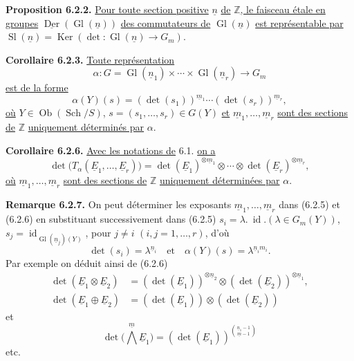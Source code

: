 \documentclass{article}
\newcommand{\Gl}{\operatorname{Gl}}
\newcommand{\Der}{\operatorname{Der}}
\newcommand{\Sch}{\operatorname{Sch}}
\newcommand{\Ker}{\operatorname{Ker}}
\begin{document}
\clearpage
\textbf{Proposition 6.2.2.} \uline{Pour toute section positive} \(\underline{n}\) \uline{de} \(\mathbb Z\)\uline{, le faisceau étale en groupes} \(\underline{\Der}(\Gl(\underline{n}))\) \uline{des commutateurs de} \(\Gl(\underline{n})\) \uline{est représentable par}
\(\operatorname{Sl}(\underline{n})=\Ker(\det:\Gl(\underline{n})\to{G}_m)\).

\textbf{Corollaire 6.2.3.} \uline{Toute représentation}
\begin{equation}\tag{6.2.4}
 \alpha:G=\Gl(\underline{n}_1)\times\cdots\times\Gl(\underline{n}_r)\longrightarrow{G}_m
\end{equation}
\uline{est de la forme}
\begin{equation}\tag{6.2.5}
 \alpha(Y)(s)=(\det(s_1))^{\underline{m}_1}\cdots(\det(s_r))^{\underline{m}_r},
\end{equation}
\uline{où} \(Y\in\operatorname{Ob}(\Sch/S)\), \(s=(s_1,\ldots,s_r)\in G(Y)\) \uline{et} \(\underline{m}_1,\ldots,\underline{m}_r\) \uline{sont des sections de} \(\mathbb Z\) \uline{uniquement déterminés par} \(\alpha\).

\textbf{Corollaire 6.2.6.} \uline{Avec les notations de} 6.1. \uline{on a}
\[
 \det\bigl(T_\alpha(\underline{E}_1,\ldots,\underline{E}_r)\bigr)
 =
 \det(\underline{E}_1)^{\otimes \underline{m}_1}\otimes\cdots\otimes
 \det(\underline{E}_r)^{\otimes \underline{m}_r},
\]
\uline{où} \(\underline{m}_1,\ldots,\underline{m}_r\) \uline{sont des sections de} \(\mathbb Z\) \uline{uniquement déterminées par} \(\alpha\).

\textbf{Remarque 6.2.7.} On peut déterminer les exposants \(\underline{m}_1,\ldots,\underline{m}_r\) dans (6.2.5) et (6.2.6) en substituant successivement dans (6.2.5)
\(s_i=\lambda.\ \operatorname{id}.(\lambda\in{G}_m(Y))\), \(s_j=\operatorname{id}_{\Gl(\underline{n}_j)(Y)}\), pour \(j\ne i\) \((i,j=1,\ldots,r)\), d'où
\[
 \det(s_i)=\lambda^{\underline{n}_i}\quad\text{et}\quad
 \alpha(Y)(s)=\lambda^{\underline{n}_im_i}.
\]
Par exemple on déduit ainsi de (6.2.6)
\begin{align}
 \det(\underline{E}_1\otimes \underline{E}_2)&=(\det(\underline{E}_1))^{\otimes \underline{n}_2}\otimes(\det(\underline{E}_2))^{\otimes \underline{n}_1}, \tag{6.2.8}\\
 \det(\underline{E}_1\oplus \underline{E}_2)&=(\det(\underline{E}_1))\otimes(\det(\underline{E}_2)) \tag{6.2.9}
\end{align}
et
\begin{equation}\tag{6.2.10}
 \det\bigl(\bigwedge\limits^{\underline{m}} \underline{E}_1\bigr)=(\det(\underline{E}_1))^{\binom{\underline{n}_1-1}{\underline{m}-1}}
\end{equation}
etc.
\end{document}
